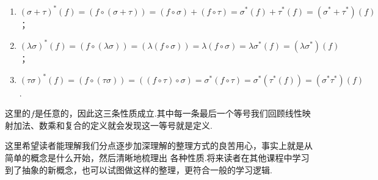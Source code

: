 \begin{enumerate}
\begin{enumerate}
        \item $(\sigma+\tau)^*(f)=(f\circ(\sigma+\tau))=(f\circ\sigma)+(f\circ\tau)=\sigma^*(f)+\tau^*(f)=(\sigma^*+\tau^*)(f)$；
        \item $(\lambda\sigma)^*(f)=(f\circ(\lambda\sigma))=(\lambda(f\circ\sigma))=\lambda(f\circ\sigma)=\lambda\sigma^*(f)=(\lambda\sigma^*)(f)$；
        \item $(\tau\sigma)^*(f)=(f\circ(\tau\sigma))=((f\circ\tau)\circ\sigma)=\sigma^*(f\circ\tau)=\sigma^*(\tau^*(f))=(\sigma^*\tau^*)(f)$.
    \end{enumerate}
    这里的$f$是任意的，因此这三条性质成立.其中每一条最后一个等号我们回顾线性映射加法、数乘和复合的定义就会发现这一等号就是定义.
\end{enumerate}
这里希望读者能理解我们分点逐步加深理解的整理方式的良苦用心，事实上就是从简单的概念是什么开始，然后清晰地梳理出
各种性质.将来读者在其他课程中学习到了抽象的新概念，也可以试图做这样的整理，更符合一般的学习逻辑.

